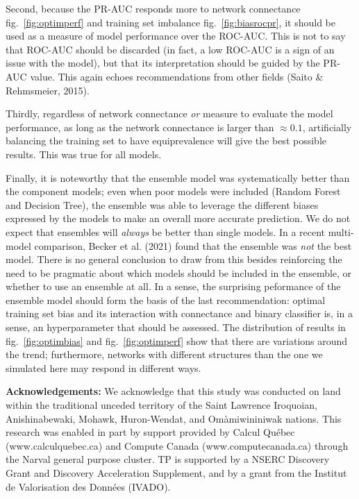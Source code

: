 \documentclass[11pt]{article}
\begin{document}
Second, because the PR-AUC responds more to network connectance
fig.~\ref{fig:optimperf} and training set imbalance
fig.~\ref{fig:biasrocpr}, it should be used as a measure of model
performance over the ROC-AUC. This is not to say that ROC-AUC should be
discarded (in fact, a low ROC-AUC is a sign of an issue with the model),
but that its interpretation should be guided by the PR-AUC value. This
again echoes recommendations from other fields (Saito \& Rehmsmeier,
2015).

Thirdly, regardless of network connectance \emph{or} measure to evaluate
the model performance, as long as the network connectance is larger than
\(\approx 0.1\), artificially balancing the training set to have
equiprevalence will give the best possible results. This was true for
all models.

Finally, it is noteworthy that the ensemble model was systematically
better than the component models; even when poor models were included
(Random Forest and Decision Tree), the ensemble was able to leverage the
different biases expressed by the models to make an overall more
accurate prediction. We do not expect that ensembles will \emph{always}
be better than single models. In a recent multi-model comparison, Becker
et al. (2021) found that the ensemble was \emph{not} the best model.
There is no general conclusion to draw from this besides reinforcing the
need to be pragmatic about which models should be included in the
ensemble, or whether to use an ensemble at all. In a sense, the
surprising peformance of the ensemble model should form the basis of the
last recommendation: optimal training set bias and its interaction with
connectance and binary classifier is, in a sense, an hyperparameter that
should be assessed. The distribution of results in
fig.~\ref{fig:optimbias} and fig.~\ref{fig:optimperf} show that there
are variations around the trend; furthermore, networks with different
structures than the one we simulated here may respond in different ways.

\textbf{Acknowledgements:} We acknowledge that this study was conducted
on land within the traditional unceded territory of the Saint Lawrence
Iroquoian, Anishinabewaki, Mohawk, Huron-Wendat, and Omàmiwininiwak
nations. This research was enabled in part by support provided by Calcul
Québec (www.calculquebec.ca) and Compute Canada (www.computecanada.ca)
through the Narval general purpose cluster. TP is supported by a NSERC
Discovery Grant and Discovery Acceleration Supplement, and by a grant
from the Institut de Valorisation des Données (IVADO).
\end{document}
